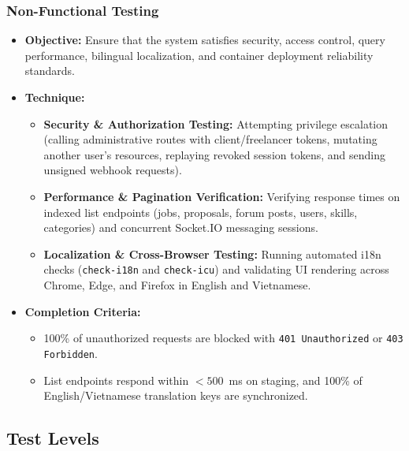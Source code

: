 \documentclass[12pt,a4paper]{article}
\begin{document}
\subsubsection{Non-Functional Testing}
\begin{itemize}
  \item \textbf{Objective:} Ensure that the system satisfies security, access control, query performance, bilingual localization, and container deployment reliability standards.
  \item \textbf{Technique:}
  \begin{itemize}
    \item \textbf{Security \& Authorization Testing:} Attempting privilege escalation (calling administrative routes with client/freelancer tokens, mutating another user's resources, replaying revoked session tokens, and sending unsigned webhook requests).
    \item \textbf{Performance \& Pagination Verification:} Verifying response times on indexed list endpoints (jobs, proposals, forum posts, users, skills, categories) and concurrent Socket.IO messaging sessions.
    \item \textbf{Localization \& Cross-Browser Testing:} Running automated i18n checks (\texttt{check-i18n} and \texttt{check-icu}) and validating UI rendering across Chrome, Edge, and Firefox in English and Vietnamese.
  \end{itemize}
  \item \textbf{Completion Criteria:}
  \begin{itemize}
    \item 100\% of unauthorized requests are blocked with \texttt{401 Unauthorized} or \texttt{403 Forbidden}.
    \item List endpoints respond within $< 500$~ms on staging, and 100\% of English/Vietnamese translation keys are synchronized.
  \end{itemize}
\end{itemize}

\subsection{Test Levels}
\end{document}
